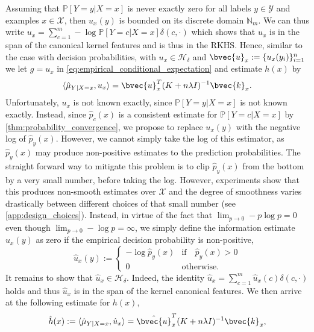 \documentclass{article}
\begin{document}
	Assuming that $\mathbb{P}[Y = y | X = x]$ is never exactly zero for all labels $y \in \mathcal{Y}$ and examples $x \in \mathcal{X}$, then $u_{x}(y)$ is bounded on its discrete domain $\mathbb{N}_{m}$. We can thus write $u_{x} = \sum_{c = 1}^{m} - \log{\mathbb{P}[Y = c | X = x]} \delta(c, \cdot)$ which shows that $u_{x}$ is in the span of the canonical kernel features and is thus in the RKHS. Hence, similar to the case with decision probabilities, with $u_{x} \in \mathcal{H}_{\delta}$ and $\bvec{u}_{x} := \{u_{x}(y_{i})\}_{i = 1}^{n}$ we let $g = u_{x}$ in \eqref{eq:empirical_conditional_expectation} and estimate $h(x)$ by
	\begin{equation}
		\langle \hat{\mu}_{Y | X = x}, u_{x} \rangle = \bvec{u}_{x}^{T} (K + n \lambda I)^{-1} \bvec{k}_{x}.
	\end{equation}
	Unfortunately, $u_{x}$ is not known exactly, since $\mathbb{P}[Y = y | X = x]$ is not known exactly. Instead, since $\hat{p}_{c}(x)$ is a consistent estimate for $\mathbb{P}[Y = c | X = x]$ by \cref{thm:probability_convergence}, we propose to replace $u_{x}(y)$ with the negative log of $\hat{p}_{y}(x)$. However, we cannot simply take the log of this estimator, as $\hat{p}_{y}(x)$ may produce non-positive estimates to the prediction probabilities. The straight forward way to mitigate this problem is to clip $\hat{p}_{y}(x)$ from the bottom by a very small number, before taking the log. However, experiments show that this produces non-smooth estimates over $\mathcal{X}$ and the degree of smoothness varies drastically between different choices of that small number (see \cref{app:design_choices}). Instead, in virtue of the fact that $\lim_{p \to 0} - p \log{p} = 0$ even though $\lim_{p \to 0} - \log{p} = \infty$, we simply define the information estimate $\hat{u}_{x}(y)$ as zero if the empirical decision probability is non-positive,
	\begin{equation}
		\hat{u}_{x}(y) := \begin{cases}
		- \log{\hat{p}_{y}(x)} & \mathrm{if } \quad \hat{p}_{y}(x) > 0 \\
		0 & \mathrm{otherwise}. \end{cases}
	\label{eq:empirical_information}
	\end{equation}
	It remains to show that $\hat{u}_{x} \in \mathcal{H}_{\delta}$. Indeed, the identity $\hat{u}_{x} = \sum_{c = 1}^{m} \hat{u}_{x}(c) \delta(c, \cdot)$ holds and thus $\hat{u}_{x}$ is in the span of the kernel canonical features. We then arrive at the following estimate for $h(x)$,
	\begin{equation}
		\hat{h}(x) := \langle \hat{\mu}_{Y | X = x}, \hat{u}_{x} \rangle = \hat{\bvec{u}}_{x}^{T} (K + n \lambda I)^{-1} \bvec{k}_{x},
		\label{eq:empirical_information_entropy}
	\end{equation}
\end{document}
